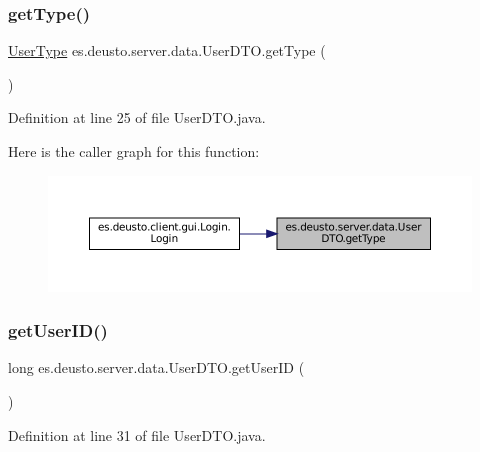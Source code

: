 \subsubsection{\texorpdfstring{getType()}{getType()}}
{\footnotesize\ttfamily \mbox{\hyperlink{enumes_1_1deusto_1_1server_1_1jdo_1_1_user_type}{User\+Type}} es.\+deusto.\+server.\+data.\+User\+D\+T\+O.\+get\+Type (\begin{DoxyParamCaption}{ }\end{DoxyParamCaption})}



Definition at line 25 of file User\+D\+T\+O.\+java.

Here is the caller graph for this function\+:
\nopagebreak
\begin{figure}[H]
\begin{center}
\leavevmode
\includegraphics[width=350pt]{classes_1_1deusto_1_1server_1_1data_1_1_user_d_t_o_a4e7fdc51138f595198b84687dadd3388_icgraph}
\end{center}
\end{figure}
\mbox{\label{classes_1_1deusto_1_1server_1_1data_1_1_user_d_t_o_ae04b78d874974f7f3307b68fa2a15210}} 
\subsubsection{\texorpdfstring{getUserID()}{getUserID()}}
{\footnotesize\ttfamily long es.\+deusto.\+server.\+data.\+User\+D\+T\+O.\+get\+User\+ID (\begin{DoxyParamCaption}{ }\end{DoxyParamCaption})}



Definition at line 31 of file User\+D\+T\+O.\+java.


